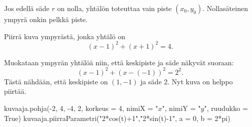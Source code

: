 Jos edellä säde $r$ on nolla, yhtälön toteuttaa vain piste $(x_{0}, y_{0})$. Nollasäteinen ympyrä onkin pelkkä piste.




\begin{esimerkki}
Piirrä kuva ympyrästä, jonka yhtälö on
\[
(x-1)^2+(x+1)^2=4.
\]
\begin{esimratk}
Muokataan ympyrän yhtälöä niin, että keskipiste ja säde näkyvät suoraan:
\[
(x-1)^2+(x-(-1))^2=2^2.
\]
Tästä nähdään, että keskipiste on $(1, -1)$ ja säde 2. Nyt kuva on helppo piirtää.

\begin{kuva}
    kuvaaja.pohja(-2, 4, -4, 2, korkeus = 4, nimiX = "$x$", nimiY = "$y$", ruudukko = True)
    kuvaaja.piirraParametri("2*cos(t)+1","2*sin(t)-1", a = 0, b = 2*pi)
\end{kuva}

\end{esimratk}
\end{esimerkki}



